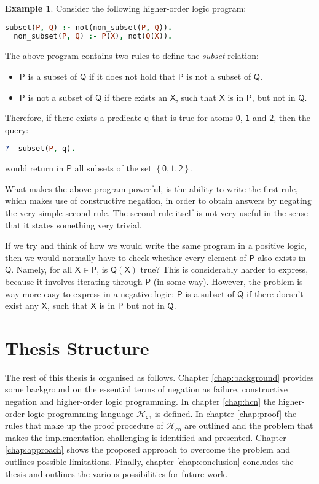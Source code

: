 \documentclass[inscr,ack,preface]{dithesis}
\theoremstyle{definition}
\newtheorem{example}{Example}[chapter]
\newcommand{\hcn}{$\mathcal{H}_\mathsf{cn}$}
\newcommand{\msf}[1]{$\mathsf{#1}$}
\begin{document}
\begin{example} Consider the following higher-order logic program:
\begin{lstlisting}[language=Prolog,frame=single]
  subset(P, Q) :- not(non_subset(P, Q)).
  non_subset(P, Q) :- P(X), not(Q(X)).
\end{lstlisting}
The above program contains two rules to define the \emph{subset} relation:
\begin{itemize}
  \item \msf{P} is a subset of \msf{Q} if it does not hold that \msf{P} is not a subset of \msf{Q}.
  \item \msf{P} is not a subset of \msf{Q} if there exists an \msf{X}, such that \msf{X} is in \msf{P}, but not in \msf{Q}.
\end{itemize}
Therefore, if there exists a predicate \msf{q} that is true for atoms \msf{0}, \msf{1} and \msf{2}, then the query:
\begin{lstlisting}[language=Prolog,frame=single]
  ?- subset(P, q).
\end{lstlisting}
would return in \msf{P} all subsets of the set \msf{\left\{ 0, 1, 2 \right\}}.

What makes the above program powerful, is the ability to write the first rule, which makes use of constructive negation, in order to obtain answers by negating the very simple second rule. The second rule itself is not very useful in the sense that it states something very trivial.

If we try and think of how we would write the same program in a positive logic, then we would normally have to check whether every element of \msf{P} also exists in \msf{Q}. Namely, for all \msf{X \in P}, is \msf{Q(X)} true? This is considerably harder to express, because it involves iterating through \msf{P} (in some way). However, the problem is way more easy to express in a negative logic: \msf{P} is a subset of \msf{Q} if there doesn't exist any \msf{X}, such that \msf{X} is in \msf{P} but not in \msf{Q}.

\end{example}

\section{Thesis Structure}
The rest of this thesis is organised as follows. Chapter \ref{chap:background} provides some background on the essential terms of negation as failure, constructive negation and higher-order logic programming. In chapter \ref{chap:hcn} the higher-order logic programming language \hcn{} is defined. In chapter \ref{chap:proof} the rules that make up the proof procedure of \hcn{} are outlined and the problem that makes the implementation challenging is identified and presented. Chapter \ref{chap:approach} shows the proposed approach to overcome the problem and outlines possible limitations. Finally, chapter \ref{chap:conclusion} concludes the thesis and outlines the various possibilities for future work.
\end{document}
